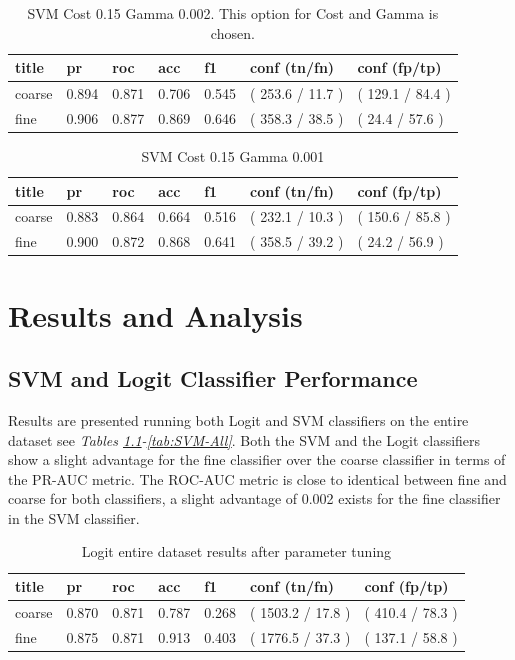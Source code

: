 \documentclass[ms]{nuthesis}
\begin{document}
\FloatBarrier
\begin{table}[H]
\centering
\caption{SVM Cost 0.15 Gamma 0.002. This option for Cost and Gamma is chosen.}
\label{tab:SVM-Cp15-Gp002}
\begin{tabular}{|l||l||l||l||l||l||l|}\toprule
title & pr & roc & acc & f1 & conf (tn/fn) & conf (fp/tp) \\ \midrule
coarse & 0.894 & 0.871 & 0.706 & 0.545 & ( 253.6 / 11.7 ) & ( 129.1 / 84.4 ) \\
fine & 0.906 & 0.877 & 0.869 & 0.646 & ( 358.3 / 38.5 ) & ( 24.4 / 57.6 ) \\ \bottomrule
\end{tabular}
\end{table}
\FloatBarrier

\FloatBarrier
\begin{table}[H]
\centering
\caption{SVM Cost 0.15 Gamma 0.001}
\label{tab:SVM-Cp15-Gp001}
\begin{tabular}{|l||l||l||l||l||l||l|}\toprule
title & pr & roc & acc & f1 & conf (tn/fn) & conf (fp/tp) \\ \midrule
coarse & 0.883 & 0.864 & 0.664 & 0.516 & ( 232.1 / 10.3 ) & ( 150.6 / 85.8 ) \\
fine & 0.900 & 0.872 & 0.868 & 0.641 & ( 358.5 / 39.2 ) & ( 24.2 / 56.9 ) \\ \bottomrule
\end{tabular}
\end{table}
\FloatBarrier


\chapter{Results and Analysis}
\section{SVM and Logit Classifier Performance}
\par Results are presented running both Logit and SVM classifiers on the entire dataset
see \textit{Tables \ref{tab:LogRegAll-Wt23}-\ref{tab:SVM-All}}.
Both the SVM and the Logit classifiers show a slight advantage for the fine
classifier over the coarse classifier in terms of the PR-AUC metric. The ROC-AUC
metric is close to identical between fine and coarse for both classifiers, a slight
advantage of 0.002 exists for the fine classifier in the SVM classifier.


\FloatBarrier
\begin{table}[H]
\centering
\caption{Logit entire dataset results after parameter tuning}
\label{tab:LogRegAll-Wt23}
\begin{tabular}{|l||l||l||l||l||l||l|}\toprule
title & pr & roc & acc & f1 & conf (tn/fn) & conf (fp/tp) \\ \midrule
coarse & 0.870 & 0.871 & 0.787 & 0.268 & ( 1503.2 / 17.8 ) & ( 410.4 / 78.3 ) \\
fine & 0.875 & 0.871 & 0.913 & 0.403 & ( 1776.5 / 37.3 ) & ( 137.1 / 58.8 ) \\ \bottomrule
\end{tabular}
\end{table}
\FloatBarrier
\end{document}
